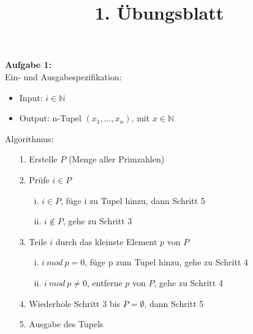 \documentclass{article}
\title{1. \"Ubungsblatt}
\author{}
\begin{document}
\maketitle

\textbf{Aufgabe 1:}\\

Ein- und Ausgabespezifikation:
\begin{itemize}
	\item Input: $i \in\mathbb{N}$
	\item Output: n-Tupel $(x_1,\dots,x_n)$, mit $x\in\mathbb{N}$
\end{itemize}

Algorithmus:
\begin{itemize}
	\item[1.] Erstelle $P$ (Menge aller Primzahlen)
	\item[2.] Prüfe $i\in P$
	\begin{itemize}
		\item[i.] $i\in P$, f\"uge i zu Tupel hinzu, dann Schritt 5
		\item[ii.] $i\notin P$, gehe zu Schritt 3
	\end{itemize}
	\item[3.] Teile $i$ durch das kleinste Element $p$ von $P$
	\begin{itemize}
		\item[i.] $i\ mod\ p=0$, f\"uge p zum Tupel hinzu, gehe zu Schritt 4
		\item[ii.] $i\ mod\ p\neq 0$, entferne $p$ von $P$, gehe zu Schritt 4
	\end{itemize}
	\item[4.] Wiederhole Schritt 3 bis $P={\emptyset}$, dann Schritt 5
	\item[5.] Ausgabe des Tupels
\end{itemize}
\end{document}

